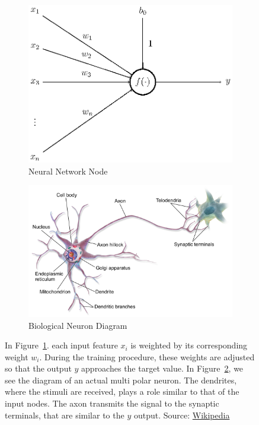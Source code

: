 \begin{figure}[H]
	\begin{subfigure}{0.5\linewidth}
		\centering
		\includegraphics[width=0.9\linewidth]{figures/neuron.eps}
		\caption{Neural Network Node}
		\label{fig:modelNeuron_a}
	\end{subfigure}
	\begin{subfigure}{0.5\linewidth}
		\centering
		\includegraphics[width=0.9\linewidth]{figures/MultipolarNeuron.png}
		\caption{Biological Neuron Diagram}
		\label{fig:modelNeuron_b}
	\end{subfigure}
		
    \caption{In Figure~\ref{fig:modelNeuron_a}. each input feature $x_i$ is weighted by its corresponding weight $w_i$. During the training procedure, these weights are adjusted so that the output $y$ approaches the target value. In Figure~\ref{fig:modelNeuron_b}, we see the diagram of an actual multi polar neuron. The dendrites, where the stimuli are received, plays a role similar to that of the input nodes. The axon transmits the signal to the synaptic terminals, that are similar to the $y$ output. Source: \href{https://en.wikipedia.org/wiki/Neuron\#/media/File:Neuron\_Hand-tuned.sv://en.wikipedia.org/wiki/Neuron\#/media/File:Blausen\_0657\_MultipolarNeuron.png}{Wikipedia}}
	\label{fig:modelNeuron}
\end{figure}


